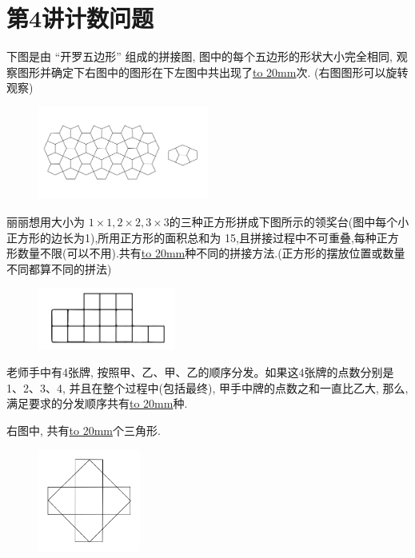 \section{第4讲\quad 计数问题}

\item {
    下图是由 ``开罗五边形'' 组成的拼接图, 图中的每个五边形的形状大小完全相同, 观察图形并确定下右图中的图形在下左图中共出现了\underline{\hbox to 20mm{}}次. (右图图形可以旋转观察)
    \begin{figure}[H] 
        \centering
        \includegraphics[width=0.5\textwidth]{./pics/Chapter_6/8.png}
    \end{figure}
}

\item {
    丽丽想用大小为 $1\times 1, 2\times 2, 3\times 3$的三种正方形拼成下图所示的领奖台(图中每个小正方形的边长为1),所用正方形的面积总和为 15,且拼接过程中不可重叠,每种正方形数量不限(可以不用).共有\underline{\hbox to 20mm{}}种不同的拼接方法.(正方形的摆放位置或数量不同都算不同的拼法)
    \begin{figure}[H] 
        \centering
        \includegraphics[width=0.4\textwidth]{./pics/Chapter_6/9.png}
    \end{figure}
}

\item {
    老师手中有4张牌, 按照甲、乙、甲、乙的顺序分发。如果这4张牌的点数分别是 1、2、3、4, 并且在整个过程中(包括最终), 甲手中牌的点数之和一直比乙大, 那么, 满足要求的分发顺序共有\underline{\hbox to 20mm{}}种.
    \vspace{1cm}
}

\item {
    右图中, 共有\underline{\hbox to 20mm{}}个三角形.
    \begin{figure}[H] 
        \centering
        \includegraphics[width=0.3\textwidth]{./pics/Chapter_6/12.png}
    \end{figure}
}

